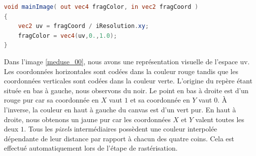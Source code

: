 \begin{minipage}{\linewidth}
\begin{lstlisting}[language=GLSL, caption=uv avec l'origine en bas à gauche,captionpos=b,frame=single]
void mainImage( out vec4 fragColor, in vec2 fragCoord )
{
    vec2 uv = fragCoord / iResolution.xy;
    fragColor = vec4(uv,0.,1.0);
}
\end{lstlisting}
\end{minipage}

Dans l'image \ref{meduse_00}, nous avons une représentation visuelle de l'espace uv. Les coordonnées horizontales sont codées dans la couleur rouge tandis que les coordonnées verticales sont codées dans la couleur verte. L'origine du repère étant située en bas à gauche, nous observons du noir. Le point en bas à droite est d'un rouge pur car sa coordonnée en $X$ vaut $1$ et sa coordonnée en $Y$ vaut $0$. À l'inverse, la couleur en haut à gauche du canvas est d'un vert pur. En haut à droite, nous obtenons un jaune pur car les coordonnées $X$ et $Y$ valent toutes les deux $1$. Tous les \textit{pixels} intermédiaires possèdent une couleur interpolée dépendante de leur distance par rapport à chacun des quatre coins. Cela est effectué automatiquement lors de l'étape de rastérisation.


